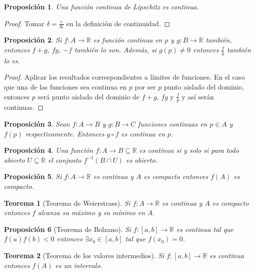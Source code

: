 \documentclass{article}
\newtheorem{theorem}{Teorema}
\newtheorem{prop}{Proposición}
\newcommand{\reales}{\mathbb{R}}
\begin{document}
\begin{prop}
	Una función continua de Lipschitz es continua.
\end{prop}

\begin{proof}
	Tomar $\delta = \frac{\varepsilon}{K}$ en la definición de continuidad. 
\end{proof}

\begin{prop}
	Si $f: A \rightarrow \reales$ es función continua en $p$ y $g: B \rightarrow \reales$ también, entonces $f + g$, $fg$, $-f$ también lo son. Además, si $g(p) \neq 0$ entonces $\frac{f}{g}$ también lo es.
\end{prop}

\begin{proof}
	Aplicar los resultados correspondientes a límites de funciones. En el caso que una de las funciones sea continua en $p$ por ser $p$ punto aislado del dominio, entonces $p$ será punto aislado del dominio de $f+g$, $fg$ y $\frac{f}{g}$ y así serán continuas.
\end{proof}

\begin{prop}
	Sean $f: A \rightarrow B$ y $g: B \rightarrow C$ funciones continuas en $p\in A$ y $f(p)$ respectivamente. Entonces $g \circ f$ es continua en $p$.
\end{prop}

\begin{prop}
	Una función $f: A \rightarrow B \subseteq \reales$ es continua si y solo si para todo abierto $U \subseteq \reales$ el conjunto $f^{-1}(B \cap U)$ es abierto.
\end{prop}

\begin{prop}
	Si $f: A \rightarrow \reales$ es continua y $A$ es compacto entonces $f(A)$ es compacto. 
\end{prop}

\begin{theorem}[Teorema de Weierstrass]
	Si $f: A \rightarrow \reales$ es continua y $A$ es compacto entonces $f$ alcanza su máximo y su mínimo en $A$.
\end{theorem}

\begin{prop}[Teorema de Bolzano]
	Si $f: [a, b] \rightarrow \reales$ es continua tal que $f(a)f(b) < 0$ entonces $\exists x_0 \in [a, b]$ tal que $f(x_0) = 0$.
\end{prop}

\begin{theorem}[Teorema de los valores intermedios]
	Si $f: [a, b] \rightarrow \reales$ es continua entonces $f(A)$ es un intervalo.
\end{theorem}
\end{document}
